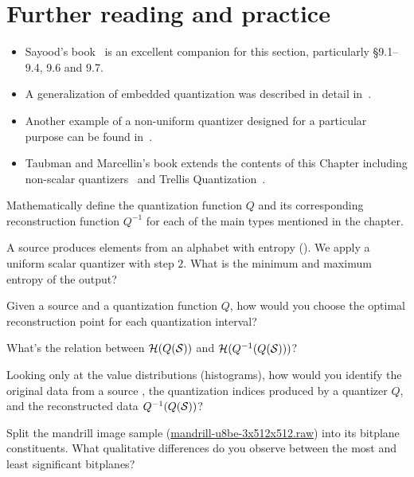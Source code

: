 \section*{Further reading and practice}
\vspace{0.25cm}
\begin{itemize}
\item Sayood's book~\cite{sayood_introduction} is an excellent companion for this section,
particularly \S 9.1--9.4, 9.6 and 9.7.
\item A generalization of embedded quantization was described in detail in~\cite{auli_geq}.
\item Another example of a non-uniform quantizer designed for a particular purpose
can be found in~\cite{hernandez_analysis}.
\item Taubman and Marcellin's book extends the contents of this Chapter including
non-scalar quantizers~\cite[\S 3.4]{taubman2002jpeg2000} and Trellis Quantization~\cite[\S 3.5]{taubman2002jpeg2000}.
\end{itemize}

\begin{exercise}
Mathematically define the quantization function $Q$ and its corresponding reconstruction
function $Q^{-1}$ for each of the main types mentioned in the chapter.
\end{exercise}

\begin{exercise}
A source \source produces elements from an alphabet \alphabet with entropy \entropy(\source).
We apply a uniform scalar quantizer with step $2$. What is the minimum and maximum
entropy of the output?
\end{exercise}

\begin{exercise}
Given a source \source and a quantization function $Q$,
how would you choose the optimal reconstruction point for each
quantization interval?
\end{exercise}

\begin{exercise}
What's the relation between $\mathcal{H}(Q(\mathcal{S}))$ and $\mathcal{H}(Q^{-1}(Q(\mathcal{S})))$?
\end{exercise}

\begin{exercise}
Looking only at the value distributions (histograms), how would you identify the
original data from a source \source, the quantization indices produced by a quantizer $Q$,
and the reconstructed data $Q^{-1}(Q(\mathcal{S}))$?
\end{exercise}

\begin{exercise}
Split the mandrill image sample (\url{mandrill-u8be-3x512x512.raw}) into its
bitplane constituents. What qualitative differences do you observe between the
most and least significant bitplanes?
\end{exercise}



